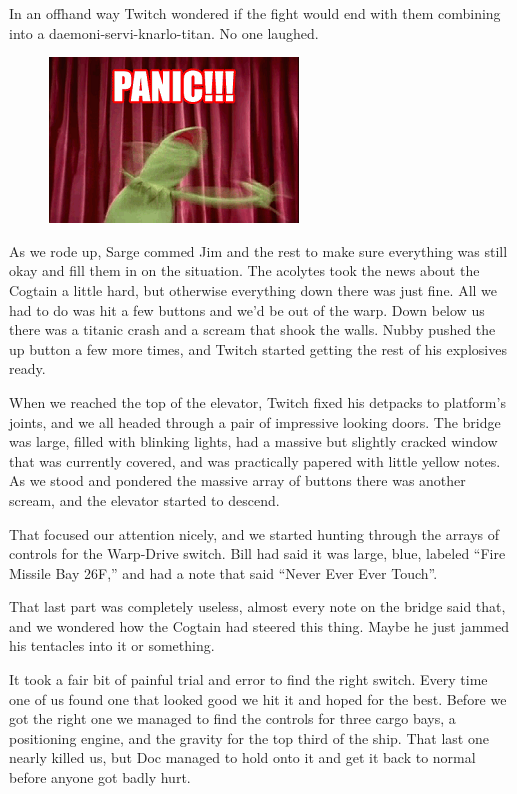 In an offhand way Twitch wondered if the fight would end with them combining into a daemoni-servi-knarlo-titan. 
No one laughed.

\begin{figure}
	\begin{center}
		\includegraphics[width=\figwidth]{pics/7/45.png}
	\end{center}
\end{figure}
As we rode up, Sarge commed Jim and the rest to make sure everything was still okay and fill them in on the situation. 
The acolytes took the news about the Cogtain a little hard, but otherwise everything down there was just fine. 
All we had to do was hit a few buttons and we’d be out of the warp. 
Down below us there was a titanic crash and a scream that shook the walls. 
Nubby pushed the up button a few more times, and Twitch started getting the rest of his explosives ready.

When we reached the top of the elevator, Twitch fixed his detpacks to platform’s joints, and we all headed through a pair of impressive looking doors. 
The bridge was large, filled with blinking lights, had a massive but slightly cracked window that was currently covered, and was practically papered with little yellow notes. 
As we stood and pondered the massive array of buttons there was another scream, and the elevator started to descend. 


That focused our attention nicely, and we started hunting through the arrays of controls for the Warp-Drive switch. 
Bill had said it was large, blue, labeled “Fire Missile Bay 26F,” and had a note that said “Never Ever Ever Touch”. 

That last part was completely useless, almost every note on the bridge said that, and we wondered how the Cogtain had steered this thing. 
Maybe he just jammed his tentacles into it or something.

It took a fair bit of painful trial and error to find the right switch. 
Every time one of us found one that looked good we hit it and hoped for the best. 
Before we got the right one we managed to find the controls for three cargo bays, a positioning engine, and the gravity for the top third of the ship. 
That last one nearly killed us, but Doc managed to hold onto it and get it back to normal before anyone got badly hurt.

